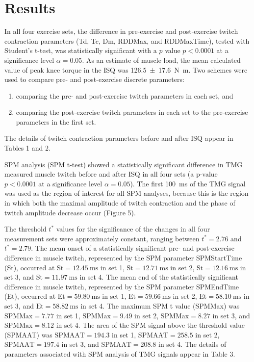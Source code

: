 \documentclass[utf8]{style/FrontiersinHarvard}
\begin{document}
\section{Results}
In all four exercise sets, the difference in pre-exercise and post-exercise twitch contraction parameters (Td, Tc, Dm, RDDMax, and RDDMaxTime), tested with Student's t-test, was statistically significant with a $ p $ value $ p < 0.0001 $ at a significance level $ \alpha = 0.05 $.
As an estimate of muscle load, the mean calculated value of peak knee torque in the ISQ was \SI{126.5 \pm 17.6}{\newton \meter}.
Two schemes were used to compare pre- and post-exercise discrete parameters:
\begin{enumerate}

    \item comparing the pre- and post-exercise twitch parameters in each set, and

    \item comparing the post-exercise twitch parameters in each set to the pre-exercise parameters in the first set.

\end{enumerate}
The details of twitch contraction parameters before and after ISQ appear in Tables 1 and 2.

SPM analysis (SPM t-test) showed a statistically significant difference in TMG measured muscle twitch before and after ISQ in all four sets (a p-value $ p < 0.0001 $ at a significance level $ \alpha = 0.05 $).
The first \SI{100}{\milli \second} of the TMG signal was used as the region of interest for all SPM analyses, because this is the region in which both the maximal amplitude of twitch contraction and the phase of twitch amplitude decrease occur (Figure 5).

The threshold $ t^{*} $ values for the significance of the changes in all four measurement sets were approximately constant, ranging between $ t^{*} = 2.76 $ and $ t^{*} = 2.79 $.
The mean onset of a statistically significant pre- and post-exercise difference in muscle twitch, represented by the SPM parameter SPMStartTime (St), occurred at 
$ \mathrm{St} = \SI{12.45}{\milli \second} $ in set 1,
$ \mathrm{St} = \SI{12.71}{\milli \second} $ in set 2,
$ \mathrm{St} = \SI{12.16}{\milli \second} $ in set 3, and
$ \mathrm{St} = \SI{11.97}{\milli \second} $ in set 4.
The mean end of the statistically significant difference in muscle twitch, represented by the SPM parameter SPMEndTime (Et), occurred at
$ \mathrm{Et} = \SI{59.80}{\milli \second} $ in set 1,
$ \mathrm{Et} = \SI{59.66}{\milli \second} $ in set 2,
$ \mathrm{Et} = \SI{58.10}{\milli \second} $ in set 3, and
$ \mathrm{Et} = \SI{58.82}{\milli \second} $ in set 4.
The maximum SPM t value (SPMMax) was
$ \mathrm{SPMMax} = 7.77 $ in set 1,
$ \mathrm{SPMMax} = 9.49 $ in set 2,
$ \mathrm{SPMMax} = 8.27 $ in set 3, and
$ \mathrm{SPMMax} = 8.12 $ in set 4.
The area of the SPM signal above the threshold value (SPMAAT) was
$ \mathrm{SPMAAT} = 194.3 $ in set 1,
$ \mathrm{SPMAAT} = 258.5 $ in set 2,
$ \mathrm{SPMAAT} = 197.4 $ in set 3, and
$ \mathrm{SPMAAT} = 208.8 $ in set 4.
The details of parameters associated with SPM analysis of TMG signals appear in Table 3.
\end{document}
